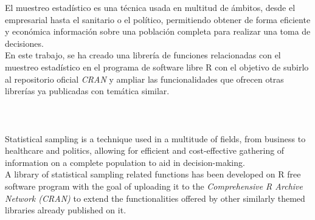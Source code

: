 El muestreo estadístico es una técnica usada en multitud de ámbitos, desde el empresarial hasta el sanitario o el político, permitiendo obtener de forma eficiente y económica información sobre una población completa para realizar una toma de decisiones.\\

En este trabajo, se ha creado una librería de funciones relacionadas con el muestreo estadístico en el programa de software libre R con el objetivo de subirlo al repositorio oficial \textit{CRAN} \cite{CRAN} y ampliar las funcionalidades que ofrecen otras librerías ya publicadas con temática similar. \\\\\\\\

Statistical sampling is a technique used in a multitude of fields, from business to healthcare and politics, allowing for efficient and cost-effective gathering of information on a complete population to aid in decision-making.\\

A library of statistical sampling related functions  has been developed on R free software program with the goal of uploading it to the \textit{Comprehensive R Archive Network (CRAN)} \cite{CRAN} to extend the functionalities offered by other similarly themed libraries already published on it.